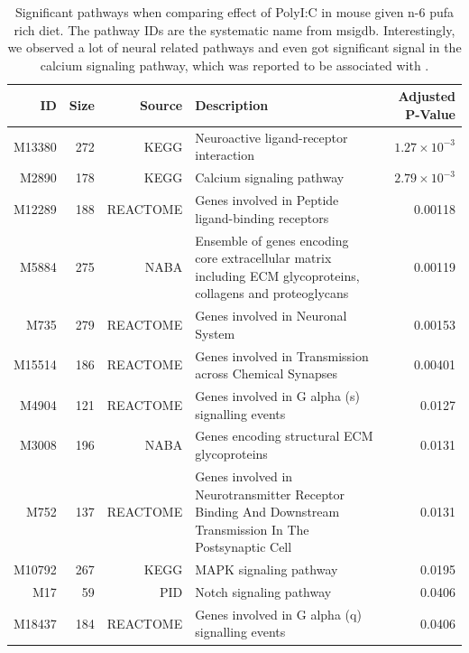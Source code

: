 \begin{landscape}
	\begin{table}
		\begin{tabular}{rrrp{10cm}r}
			\toprule
			ID&	Size&	Source&	Description&	Adjusted P-Value\\
			\midrule
			M13380&	272&	KEGG&	Neuroactive ligand-receptor interaction&	$1.27\times10^{-3}$\\
			M2890&	178&	KEGG&	Calcium signaling pathway&	$2.79\times10^{-3}$\\
			M12289&	188&	REACTOME&	Genes involved in Peptide ligand-binding receptors&	0.00118\\
			M5884&	275&	NABA&	Ensemble of genes encoding core extracellular matrix including ECM glycoproteins, collagens and proteoglycans&	0.00119\\
			M735&	279&	REACTOME&	Genes involved in Neuronal System&	0.00153\\
			M15514&	186&	REACTOME&	Genes involved in Transmission across Chemical Synapses&	0.00401\\
			M4904&	121&	REACTOME&	Genes involved in G alpha (s) signalling events&	0.0127\\
			M3008&	196&	NABA&	Genes encoding structural ECM glycoproteins&	0.0131\\
			M752&	137&	REACTOME&	Genes involved in Neurotransmitter Receptor Binding And Downstream Transmission In The Postsynaptic Cell&	0.0131\\
			M10792&	267&	KEGG&	MAPK signaling pathway&	0.0195\\
			M17&	59&	PID&	Notch signaling pathway&	0.0406\\
			M18437&	184&	REACTOME&	Genes involved in G alpha (q) signalling events&	0.0406\\
			\bottomrule
		\end{tabular}
		\caption[Significant Pathways When Comparing Effect of PolyI:C in Mouse Given n-6 \gls{pufa} Rich Diet]{Significant pathways when comparing effect of PolyI:C in mouse given n-6 \gls{pufa} rich diet.
			The pathway IDs are the systematic name from \gls{msigdb}.
			Interestingly, we observed a lot of neural related pathways and even got significant signal in the calcium signaling pathway, which was reported to be associated with  \citep{Purcell2014}. 
		}
		\label{tab:miaPath}
	\end{table}
	

\end{landscape}
